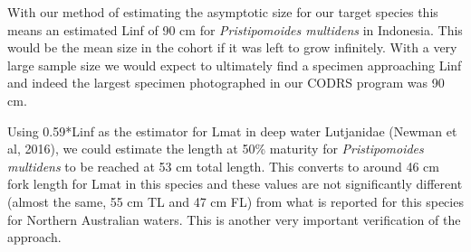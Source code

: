 With our method of estimating the asymptotic size for our target species this means an estimated Linf of 90 cm for \textit{Pristipomoides multidens} in Indonesia. This would be the mean size in the cohort if it was left to grow infinitely. With a very large sample size we would expect to ultimately find a specimen approaching Linf and indeed the largest specimen photographed in our CODRS program was 90 cm.

Using 0.59*Linf as the estimator for Lmat in deep water Lutjanidae (Newman et al, 2016), we could estimate the length at 50\% maturity for \textit{Pristipomoides multidens} to be reached at 53 cm total length. This converts to around 46 cm fork length for Lmat in this species and these values are not significantly different (almost the same, 55 cm TL and 47 cm FL) from what is reported for this species for Northern Australian waters. This is another very important verification of the approach.

\clearpage
\newpage

